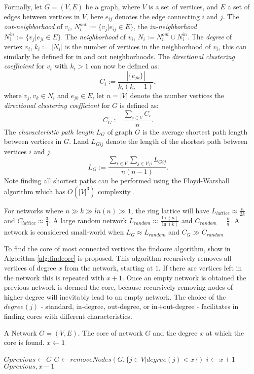 Formally, let $G=(V, E)$ be a graph, where $V$ is a set of vertices, and $E$ a set of edges between vertices in $V$, here $e_{ij}$ denotes the edge connecting $i$ and $j$.  The \textit{out-neighborhood} of $v_i$, $N_i^{out}:=\{v_j|e_{ij}\in E\}$, the \textit{in-neighborhood} $N_i^{in}:=\{v_j|e_{ji}\in E\}$. The \textit{neighborhood} of $v_i$, $N_i:=N_i^{out}\cup N_i^{in}$. The \textit{degree} of vertex $v_i$, $k_i:=|N_i|$ is the number of vertices in the neighborhood of $v_i$, this can similarly be defined for in and out neighborhoods. The \textit{directional clustering coefficient} for $v_i$ with $k_i>1$ can now be defined as:
$$C_i :=\frac{|\{e_{jk}\}|}{k_i(k_i-1)},$$
where $v_j,v_k\in N_i$ and $e_{jk}\in E$, let $n=|V|$ denote the number vertices the \textit{directional clustering coefficient} for $G$ is defined as:
$$C_G:=\frac{\sum_{i\in V} C_i}{n}.$$
The \textit{characteristic path length} $L_G$ of graph $G$ is the average shortest path length between vertices in $G$. Land  $L_{Gij}$ denote the length of the shortest path between vertices $i$ and $j$. 
$$L_G:= \frac{\sum_{i\in V} \sum_{j \in V\setminus i}L_{Gij}}{n(n-1)}.$$ 
Note finding all shortest paths can be performed using the Floyd-Warshall algorithm which has $O(|V|^3)$ complexity \cite{Floyd}.

For networks where $n\gg k\gg ln(n) \gg1$, the ring lattice will have $L_{lattice}\approx\frac{n}{2k}$ and $C_{lattice}\approx\frac{3}{4}$.
A large random network  $ L_{random}\approx\frac{\ln(n)}{\ln(k)}$ and $C_{random}=\frac{k}{n}$. A network is considered small-world when $L_G\approx L_{random}$ and $C_G \gg C_{random}$

To find the core of most connected vertices the findcore algorithm, show in Algorithm \ref{alg:findcore} is proposed. This algorithm recursively removes all vertices of degree $x$ from the network, starting at $1$. If there are vertices left in the network this is repeated with  $x+1$. Once an empty network is obtained the previous network is deemed the core, because recursively removing nodes of higher degree will inevitably lead to an empty network. The choice of the $degree(j)$ - standard, in-degree, out-degree,  or in+out-degree - facilitates in finding cores with different characteristics.

\newcommand{\FindCore}{\ensuremath{\mbox{\sc FindCore}}}
\begin{algorithm}[htb]
\caption{$\FindCore(Network)$}\label{alg:findcore}
\begin{algorithmic}
\REQUIRE A Network $G=(V,E)$.
\ENSURE The core of network $G$ and the degree $x$ at which the core is found.
\medskip
\STATE $x\gets 1$
	
	\STATE $Gprevious \gets G$
		\STATE $G\gets removeNodes(G, \{j\in V | degree(j)<x\})$ 
	\ENDWHILE
	\STATE $i \gets x+1$
\ENDWHILE
\RETURN $Gprevious, x-1$
\end{algorithmic}
\end{algorithm}